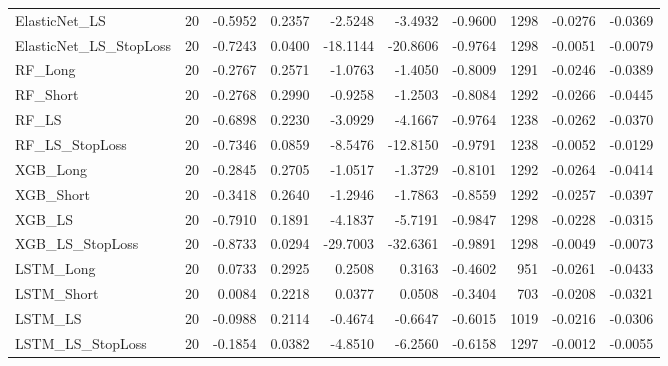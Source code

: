 \begin{tabular}{llrrrrrrrr}
\cline{1-10}
ElasticNet\_LS & 20 & -0.5952 & 0.2357 & -2.5248 & -3.4932 & -0.9600 & 1298 & -0.0276 & -0.0369 \\
\cline{1-10}
ElasticNet\_LS\_StopLoss & 20 & -0.7243 & 0.0400 & -18.1144 & -20.8606 & -0.9764 & 1298 & -0.0051 & -0.0079 \\
\cline{1-10}
RF\_Long & 20 & -0.2767 & 0.2571 & -1.0763 & -1.4050 & -0.8009 & 1291 & -0.0246 & -0.0389 \\
\cline{1-10}
RF\_Short & 20 & -0.2768 & 0.2990 & -0.9258 & -1.2503 & -0.8084 & 1292 & -0.0266 & -0.0445 \\
\cline{1-10}
RF\_LS & 20 & -0.6898 & 0.2230 & -3.0929 & -4.1667 & -0.9764 & 1238 & -0.0262 & -0.0370 \\
\cline{1-10}
RF\_LS\_StopLoss & 20 & -0.7346 & 0.0859 & -8.5476 & -12.8150 & -0.9791 & 1238 & -0.0052 & -0.0129 \\
\cline{1-10}
XGB\_Long & 20 & -0.2845 & 0.2705 & -1.0517 & -1.3729 & -0.8101 & 1292 & -0.0264 & -0.0414 \\
\cline{1-10}
XGB\_Short & 20 & -0.3418 & 0.2640 & -1.2946 & -1.7863 & -0.8559 & 1292 & -0.0257 & -0.0397 \\
\cline{1-10}
XGB\_LS & 20 & -0.7910 & 0.1891 & -4.1837 & -5.7191 & -0.9847 & 1298 & -0.0228 & -0.0315 \\
\cline{1-10}
XGB\_LS\_StopLoss & 20 & -0.8733 & 0.0294 & -29.7003 & -32.6361 & -0.9891 & 1298 & -0.0049 & -0.0073 \\
\cline{1-10}
LSTM\_Long & 20 & 0.0733 & 0.2925 & 0.2508 & 0.3163 & -0.4602 & 951 & -0.0261 & -0.0433 \\
\cline{1-10}
LSTM\_Short & 20 & 0.0084 & 0.2218 & 0.0377 & 0.0508 & -0.3404 & 703 & -0.0208 & -0.0321 \\
\cline{1-10}
LSTM\_LS & 20 & -0.0988 & 0.2114 & -0.4674 & -0.6647 & -0.6015 & 1019 & -0.0216 & -0.0306 \\
\cline{1-10}
LSTM\_LS\_StopLoss & 20 & -0.1854 & 0.0382 & -4.8510 & -6.2560 & -0.6158 & 1297 & -0.0012 & -0.0055 \\
\cline{1-10}
\bottomrule
\end{tabular}
